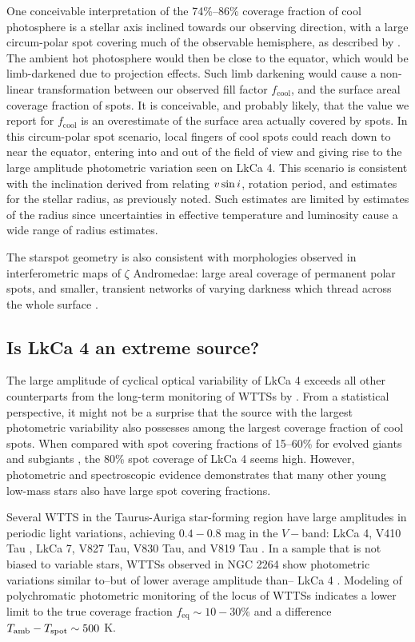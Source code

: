 \documentclass[twocolumn]{emulateapj}%
\newcommand{\name}{LkCa 4 }
\begin{document}
One conceivable interpretation of the 74\%--86\% coverage fraction of cool photosphere is a stellar axis inclined towards our observing direction, with a large circum-polar spot covering much of the observable hemisphere, as described by \citet{donati14}.  The ambient hot photosphere would then be close to the equator, which would be limb-darkened due to projection effects.  Such limb darkening would cause a non-linear transformation between our observed fill factor $f_{\mathrm{cool}}$, and the surface areal coverage fraction of spots.  It is conceivable, and probably likely, that the value we report for $f_{\mathrm{cool}}$ is an overestimate of the surface area actually covered by spots.  In this circum-polar spot scenario, local fingers of cool spots could reach down to near the equator, entering into and out of the field of view and giving rise to the large amplitude photometric variation seen on LkCa 4.  This scenario is consistent with the inclination derived from relating $v \sin i$, rotation period, and estimates for the stellar radius, as previously noted.  Such estimates are limited by estimates of the radius since uncertainties in effective temperature and luminosity cause a wide range of radius estimates.

The starspot geometry is also consistent with morphologies observed in interferometric maps of $\zeta$ Andromedae: large areal coverage of permanent polar spots, and smaller, transient networks of varying darkness which thread across the whole surface \citep{roettenbacher16}.


\subsection{Is \name an extreme source?}
The large amplitude of cyclical optical variability of LkCa 4 exceeds all other counterparts from the long-term monitoring of WTTSs by \citet{grankin08}.  From a statistical perspective, it might not be a surprise that the source with the largest photometric variability also possesses among the largest coverage fraction of cool spots.  When compared with spot covering fractions of 15--60\% for evolved giants and subgiants \citep{chugainov76,berdyugina05}, the 80\% spot coverage of LkCa 4 seems high.  However, photometric and spectroscopic evidence demonstrates that many other young low-mass stars also have large spot covering fractions.

Several WTTS in the Taurus-Auriga star-forming region have large amplitudes in periodic light variations, achieving $0.4-0.8$ mag in the $V-$band: LkCa 4, V410 Tau \citep{herbst89}, LkCa 7, V827 Tau, V830 Tau, and V819 Tau \citep{grankin08}.  In a sample that is not biased to variable stars, WTTSs observed in NGC 2264 show photometric variations similar to--but of lower average amplitude than-- LkCa 4 \citep{cody14,venuti15}.  Modeling of polychromatic photometric monitoring of the locus of WTTSs indicates a lower limit to the true coverage fraction $f_{\mathrm{eq}}\sim10-30\%$ and a difference $T_\textrm{amb}-T_\textrm{spot}\sim500$ K. 
\end{document}

